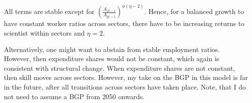 All terms are stable except for $\left(\frac{A_{ft-1}}{A_{gt-1}}\right)^{\phi(\eta-2)}$. Hence, for a balanced growth to have constant worker ratios across sectors, there have to be increasing returns to scientist within sectors and $\eta=2$.
 
Alternatively, one might want to abstain from stable employment ratios. However, then expenditure shares would not be constant, which again is consistent with structural change. When expenditure shares are not constant, then skill moves across sectors. 
However, my take on the BGP in this model is far in the future, after all transitions across sectors have taken place. Note, that I do not need to assume a BGP from 2050 onwards. 
 

